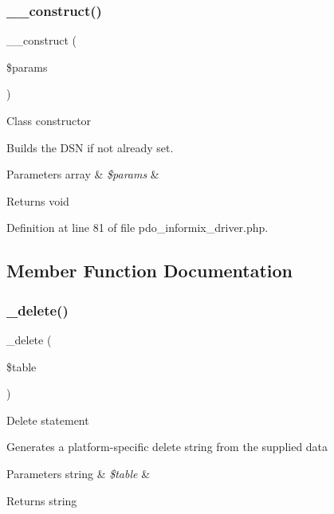 \subsubsection{\texorpdfstring{\_\_construct()}{\_\_construct()}}
{\footnotesize\ttfamily \+\_\+\+\_\+construct (\begin{DoxyParamCaption}\item[{}]{\$params }\end{DoxyParamCaption})}

Class constructor

Builds the D\+SN if not already set.


\begin{DoxyParams}[1]{Parameters}
array & {\em \$params} & \\
\hline
\end{DoxyParams}
\begin{DoxyReturn}{Returns}
void 
\end{DoxyReturn}


Definition at line 81 of file pdo\+\_\+informix\+\_\+driver.\+php.



\subsection{Member Function Documentation}
\mbox{\label{class_c_i___d_b__pdo__informix__driver_a133ea8446ded52589bd22cc9163d0896}} 
\subsubsection{\texorpdfstring{\_delete()}{\_delete()}}
{\footnotesize\ttfamily \+\_\+delete (\begin{DoxyParamCaption}\item[{}]{\$table }\end{DoxyParamCaption})\hspace{0.3cm}{\ttfamily [protected]}}

Delete statement

Generates a platform-\/specific delete string from the supplied data


\begin{DoxyParams}[1]{Parameters}
string & {\em \$table} & \\
\hline
\end{DoxyParams}
\begin{DoxyReturn}{Returns}
string 
\end{DoxyReturn}


